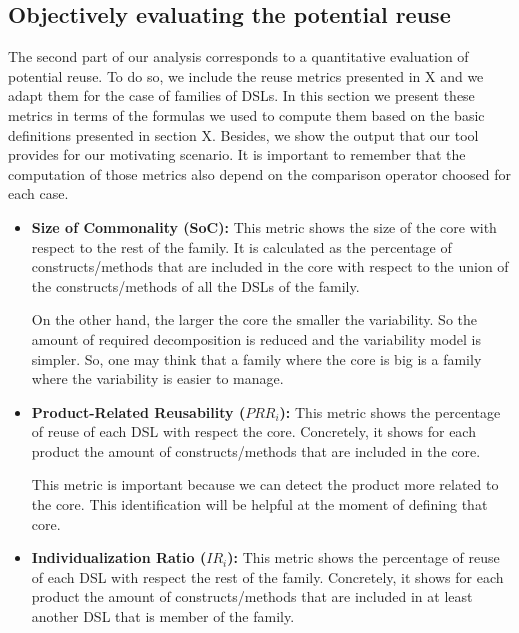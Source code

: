\subsection{Objectively evaluating the potential reuse}

The second part of our analysis corresponds to a quantitative evaluation of potential reuse. To do so, we include the reuse metrics presented in X and we adapt them for the case of families of DSLs. In this section we present these metrics in terms of the formulas we used to compute them based on the basic definitions presented in section X. Besides, we show the output that our tool provides for our motivating scenario. It is important to remember that the computation of those metrics also depend on the comparison operator choosed for each case. 

\begin{itemize}
\item \textbf{Size of Commonality (SoC):} This metric shows the size of the core with respect to the rest of the family. It is calculated as the percentage of constructs/methods that are included in the core with respect to the union of the constructs/methods of all the DSLs of the family. 

\hspace{3mm} On the other hand, the larger the core the smaller the variability. So the amount of required decomposition is reduced and the variability model is simpler. So, one may think that a family where the core is big is a family where the variability is easier to manage. 

\vspace{2mm}
\item \textbf{Product-Related Reusability ($PRR_i$):}
This metric shows the percentage of reuse of each DSL with respect the core. Concretely, it shows for each product the amount of constructs/methods that are included in the core.

\hspace{3mm} This metric is important because we can detect the product more related to the core. This identification will be helpful at the moment of defining that core. 

\vspace{2mm}
\item \textbf{Individualization Ratio ($IR_i$):}
This metric shows the percentage of reuse of each DSL with respect the rest of the family. Concretely, it shows for each product the amount of constructs/methods that are included in at least another DSL that is member of the family.


\end{itemize}

